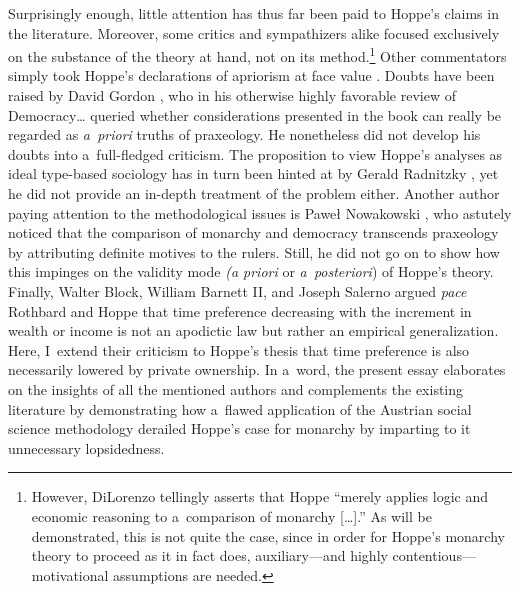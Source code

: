 Surprisingly enough, little attention has thus far been paid to Hoppe's claims in the literature. Moreover, some critics 
\parencite[][]{sierpinski_critica_2016} %
 and sympathizers 
\parencite[][]{hulsmann_hoppean_2009} %
 alike focused exclusively on the substance of the theory at hand, not on its method.\footnote{However, DiLorenzo 
\parencite*[][p.274]{hulsmann_hoppean_2009} %
 tellingly asserts that Hoppe ``merely applies logic and economic reasoning to a~comparison of monarchy […].'' As will be demonstrated, this is not quite the case, since in order for Hoppe's monarchy theory to proceed as it in fact does, auxiliary---and highly contentious---motivational assumptions are needed. } Other commentators simply took Hoppe's declarations of apriorism at face value 
\parencites[][p.116]{crovelli_toward_2007}[][]{gabis_hans-hermann_2005}[][pp.113–114]{kalita_krytyka_2009}. %
 Doubts have been raised by David Gordon 
\parencite*[][p.99]{gordon_austro-libertarian_2017}, %
 who in his otherwise highly favorable review of Democracy… queried whether considerations presented in the book can really be regarded as \textit{a~priori} truths of praxeology. He nonetheless did not develop his doubts into a~full-fledged criticism. The proposition to view Hoppe's analyses as ideal type-based sociology has in turn been hinted at by Gerald Radnitzky 
\parencite*[][p.161]{}, %
 yet he did not provide an in-depth treatment of the problem either. Another author paying attention to the methodological issues is Paweł Nowakowski 
\parencite*[][p.273]{nowakowski_dlaczego_2010}, %
 who astutely noticed that the comparison of monarchy and democracy transcends praxeology by attributing definite motives to the rulers. Still, he did not go on to show how this impinges on the validity mode \textit{(a priori} or \textit{a~posteriori}) of Hoppe's theory. Finally, Walter Block, William Barnett II, and Joseph Salerno 
\parencite*[][]{} %
 argued \textit{pace} Rothbard and Hoppe that time preference decreasing with the increment in wealth or income is not an apodictic law but rather an empirical generalization. Here, I~extend their criticism to Hoppe's thesis that time preference is also necessarily lowered by private ownership. In a~word, the present essay elaborates on the insights of all the mentioned authors and complements the existing literature by demonstrating how a~flawed application of the Austrian social science methodology derailed Hoppe's case for monarchy by imparting to it unnecessary lopsidedness.



